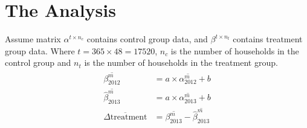 \documentclass{beamer}
\begin{document}



\section{The Analysis}

\begin{frame}
  Assume matrix $\alpha^{t \times n_c}$ contains control group data, and $\beta^{t \times n_t}$ contains treatment group data. Where $t = 365 \times 48 = 17520$, $n_c$ is the number of households in the control group and $n_t$ is the number of households in the treatment group.
  \begin{align}
    \begin{split}
      \overline{\beta^m_{2012}} &= a \times \overline{\alpha^m_{2012}} + b \\
      \overline{\hat{\beta}^m_{2013}} &= a \times \overline{\alpha^m_{2013}} + b \\
      \overline{\Delta\mbox{treatment}} &= \overline{\beta^m_{2013}} - \overline{\hat{\beta}^m_{2013}}
    \end{split}
  \end{align}
\end{frame}
\end{document}
